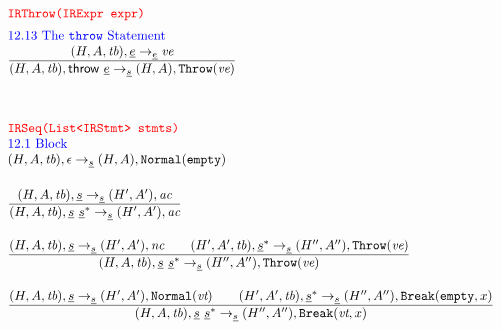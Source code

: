 \[
\begin{array}{l@{~~}l@{~~}ll}
\mtt{\normalsize\inred IRThrow(IRExpr expr)}\\[.5em]
\mbox{\inblue 12.13 The {\tt throw} Statement}\\
\frac{\begin{matrix}
\evale, \irexpr \rightarrow_{\ir\expr} \emph{ve}
\end{matrix}}{\begin{matrix}
\state, {\sf throw} \ \irexpr \rightarrow_{\ir\stmt} \res, {\tt Throw}(\emph{ve})
\end{matrix}}
\\[4em]




\mtt{\normalsize\inred IRSeq(List<IRStmt> stmts)}\\

\mbox{\inblue 12.1 Block}\\

\state,\none \rightarrow_{\ir{\stmt}} \res,\void\\[1.5em]

\frac{\begin{matrix}
\state,\ir\stmt \rightarrow_{\ir\stmt} \resp,\ac
\end{matrix}}{\begin{matrix}
\state,\ir\stmt\ \ir\stmt^* \rightarrow_{\ir{\stmt}} \resp,\ac
\end{matrix}}\\[2em]

\frac{\begin{matrix}
\state,\ir\stmt \rightarrow_{\ir\stmt} \resp,\nc
\rulesep
\statep,\ir{\stmt}^* \rightarrow_{\ir\stmt} \respp,{\tt Throw}(\emph{ve})
\end{matrix}}{\begin{matrix}
\state,\ir\stmt\ \ir\stmt^* \rightarrow_{\ir{\stmt}} \respp,{\tt Throw}(\emph{ve})
\end{matrix}}\\[2em]

\frac{\begin{matrix}
\state,\ir\stmt \rightarrow_{\ir\stmt} \resp,{\tt Normal}(\vorempty)
\rulesep
\statep,\ir{\stmt}^* \rightarrow_{\ir\stmt} \respp,{\tt Break}({\tt empty},x)
\end{matrix}}{\begin{matrix}
\state,\ir\stmt\ \ir\stmt^* \rightarrow_{\ir{\stmt}} \respp,{\tt Break}(\vorempty,x)
\end{matrix}}\\[2em]


\end{array}\]
